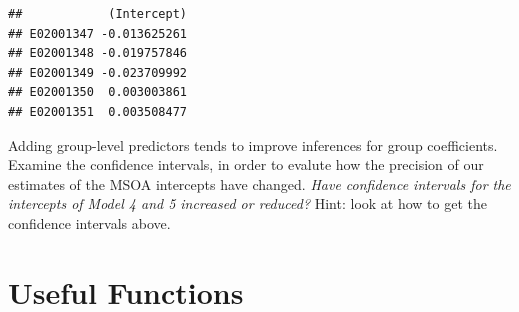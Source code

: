 \documentclass[
]{book}
\newenvironment{Shaded}{\begin{snugshade}}{\end{snugshade}}
\newcommand{\CommentTok}[1]{\textcolor[rgb]{0.56,0.35,0.01}{\textit{#1}}}
\newcommand{\DecValTok}[1]{\textcolor[rgb]{0.00,0.00,0.81}{#1}}
\newcommand{\FunctionTok}[1]{\textcolor[rgb]{0.00,0.00,0.00}{#1}}
\newcommand{\NormalTok}[1]{#1}
\newcommand{\OtherTok}[1]{\textcolor[rgb]{0.56,0.35,0.01}{#1}}
\newcommand{\SpecialCharTok}[1]{\textcolor[rgb]{0.00,0.00,0.00}{#1}}
\begin{document}
\begin{Shaded}
\end{Shaded}

\begin{verbatim}
##            (Intercept)
## E02001347 -0.013625261
## E02001348 -0.019757846
## E02001349 -0.023709992
## E02001350  0.003003861
## E02001351  0.003508477
\end{verbatim}

Adding group-level predictors tends to improve inferences for group coefficients. Examine the confidence intervals, in order to evalute how the precision of our estimates of the MSOA intercepts have changed. \emph{Have confidence intervals for the intercepts of Model 4 and 5 increased or reduced?} Hint: look at how to get the confidence intervals above.

\hypertarget{useful-functions-1}{%
\section{Useful Functions}\label{useful-functions-1}}
\end{document}
